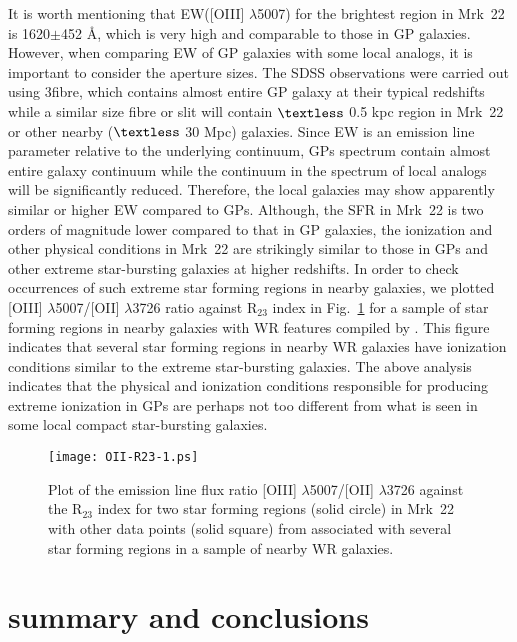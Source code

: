 \documentclass[useAMS,usenatbib]{mn2e}
\begin{document}
It is worth mentioning that EW([{\small{OIII}}] $\lambda$5007) for the brightest region in Mrk~22 is 1620$\pm$452 \AA, which is very high and comparable to those in GP galaxies. However, when comparing EW of GP galaxies with some local analogs, it is important to consider the aperture sizes. The SDSS observations were carried out using 3\arcsec fibre, which contains almost entire GP galaxy at their typical redshifts while a similar size fibre or slit will contain $\textless$ 0.5 kpc region in Mrk~22 or other nearby ($\textless$ 30 Mpc) galaxies. Since EW is an emission line parameter relative to the underlying continuum, GPs spectrum contain almost entire galaxy continuum while the continuum in the spectrum of local analogs will be significantly reduced. Therefore, the local galaxies may show apparently similar or higher EW compared to GPs. Although, the SFR in Mrk~22 is two orders of magnitude lower compared to that in GP galaxies, the ionization and other physical conditions in Mrk~22 are strikingly similar to those in GPs and other extreme star-bursting galaxies at higher redshifts. In order to check occurrences of such extreme star forming regions in nearby galaxies, we plotted [O{\small{III}}] $\lambda$5007/[O{\small{II}}] $\lambda$3726 ratio against R$_{23}$ index in Fig.~\ref{fig:13} for a sample of star forming regions in nearby galaxies with WR features compiled by \citet{2009A&A...508..615L}. This figure indicates that several star forming regions in nearby WR galaxies have ionization conditions similar to the extreme star-bursting galaxies. The above analysis indicates that the physical and ionization conditions responsible for producing extreme ionization in GPs are perhaps not too different from what is seen in some local compact star-bursting galaxies. 

\begin{figure}
\centering
\texttt{[image: OII-R23-1.ps]}
\caption{Plot of the emission line flux ratio [O{\small{III}}] $\lambda$5007/[O{\small{II}}] $\lambda$3726 against the R$_{23}$ index for two star forming regions (solid circle) in Mrk~22 with other data points (solid square) from \citet{2009A&A...508..615L} associated with several star forming regions in a sample of nearby WR galaxies.}
\label{fig:13}
\end{figure}

\section{summary and conclusions}  
\end{document}
